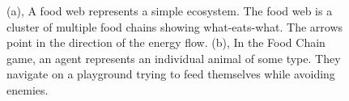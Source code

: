 \documentclass[]{interact}
\theoremstyle{plain}%
\theoremstyle{definition}
\theoremstyle{remark}
\begin{document}
\begin{figure}
\centering
{}
\caption[Caption for LOF]{(a), A food web represents a simple ecosystem. The food web is a cluster of multiple food chains showing what-eats-what. The arrows point in the direction of the energy flow. (b), In the Food Chain game, an agent represents an individual animal of some type. They navigate on a playground trying to feed themselves while avoiding enemies.}
\label{fig:food_chain_game}
\end{figure}
\end{document}
